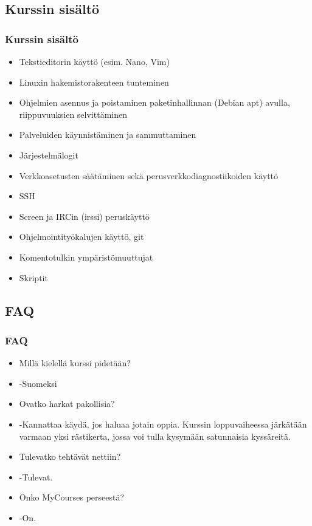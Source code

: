 \documentclass[finnish]{beamer}
\begin{document}
\begin{frame}
    \subsection{Kurssin sisältö}
    \frametitle{Kurssin sisältö}
    \begin{itemize}
        \item Tekstieditorin käyttö (esim. Nano, Vim)
        \item Linuxin hakemistorakenteen tunteminen
        \item Ohjelmien asennus ja poistaminen paketinhallinnan (Debian apt) avulla, riippuvuuksien selvittäminen
        \item Palveluiden käynnistäminen ja sammuttaminen
        \item Järjestelmälogit
        \item Verkkoasetusten säätäminen sekä perusverkkodiagnostiikoiden käyttö
        \item SSH
        \item Screen ja IRCin (irssi) peruskäyttö
        \item Ohjelmointityökalujen käyttö, git
        \item Komentotulkin ympäristömuuttujat
        \item Skriptit



    \end{itemize}
\end{frame}

\begin{frame}
    \subsection{FAQ}
    \frametitle{FAQ}
    \begin{itemize}
        \item Millä kielellä kurssi pidetään?
        \item   -Suomeksi
\pause
        \item Ovatko harkat pakollisia?
        \item   -Kannattaa käydä, jos haluaa jotain oppia. Kurssin loppuvaiheessa järkätään varmaan yksi rästikerta, jossa voi tulla kysymään satunnaisia kyssäreitä.
\pause
        \item Tulevatko tehtävät nettiin?
        \item   -Tulevat.
\pause
        \item Onko MyCourses perseestä?
        \item   -On.


    \end{itemize}
\end{frame}
\end{document}
